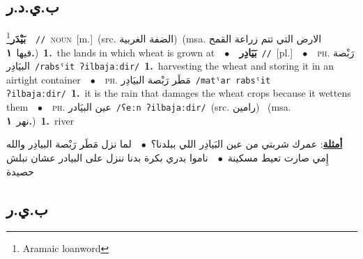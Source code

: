 \documentclass[10pt,a4paper,twoside]{article} %
\begin{document}
\begin{multicols}{2}
\vspace{-3mm}
\subsection*{\color{blue}\foreignlanguage{arabic}{ب.ي.د.ر}\color{blue}{}} 

{\setlength\topsep{0pt}\textbf{\foreignlanguage{arabic}{بَيْدَر}}\footnote{Aramaic loanword}\ \ {\color{gray}\texttt{//}\color{black}}\ \textsc{noun}\ [m.]\ (src. \color{gray}\foreignlanguage{arabic}{الضفة الغربية}\color{black})\ \color{gray}(msa. \foreignlanguage{arabic}{الارض التي تتم زراعة القمح فيها}~\foreignlanguage{arabic}{\textbf{١.}})\color{black}\ \textbf{1.}~the lands in which wheat is grown at\ \ $\bullet$\ \ \setlength\topsep{0pt}\textbf{\foreignlanguage{arabic}{بَيَادِر}}\ {\color{gray}\texttt{//}\color{black}}\ [pl.]\ \ $\bullet$\ \ \textsc{ph.} \color{gray} \foreignlanguage{arabic}{رَبْصة البيَادِر}\color{black}\ {\color{gray}\texttt{/{\sffamily rabsˤit ʔilbajaːdir}/}\color{black}}\ \textbf{1.}~harvesting the wheat and storing it in an airtight container\ \ $\bullet$\ \ \textsc{ph.} \color{gray} \foreignlanguage{arabic}{مَطَر رَبْصة البيَادِر}\color{black}\ {\color{gray}\texttt{/{\sffamily matˤar rabsˤit ʔilbajaːdir}/}\color{black}}\ \textbf{1.}~it is the rain that damages the wheat crops because it wettens them\ \ $\bullet$\ \ \textsc{ph.} \color{gray} \foreignlanguage{arabic}{عين البيَادر}\color{black}\ {\color{gray}\texttt{/{\sffamily ʕeːn ʔilbajaːdir}/}\color{black}}\ \color{gray}(src. \foreignlanguage{arabic}{رامين})\color{black}\ \color{gray} (msa. \foreignlanguage{arabic}{نهر}~\foreignlanguage{arabic}{\textbf{١.}})\color{black}\ \textbf{1.}~river\  \begin{flushright}\color{gray}\foreignlanguage{arabic}{\textbf{\underline{\foreignlanguage{arabic}{أمثلة}}}: عمرك شربتي من عين البَيادِر اللي ببلدنا؟\ $\bullet$\ \  لما نزل مَطَر رَبْصة البيادِر والله إِمي صارت تعيط مسكينة\ $\bullet$\ \  ناموا بدري بكرة بدنا ننزل على البيادر عشان نبلش حصيدة}\end{flushright}\color{black}} \vspace{2mm}

\vspace{-3mm}
\subsection*{\color{blue}\foreignlanguage{arabic}{ب.ي.ر}\color{blue}{}} 


\end{multicols}
\end{document}
